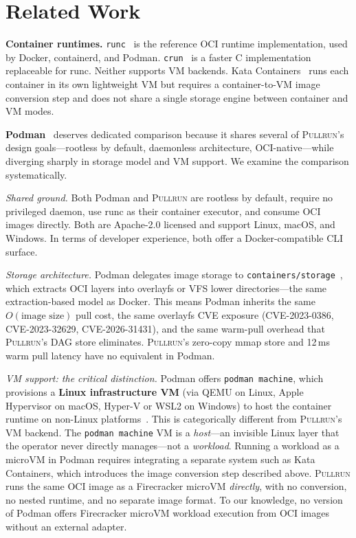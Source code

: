\documentclass[11pt,a4paper]{article}
\newcommand{\pullrun}{\textsc{Pullrun}}
\begin{document}
\section{Related Work}\label{sec:related}

\textbf{Container runtimes.} \texttt{runc}~\cite{runc} is the reference OCI runtime implementation, used by Docker, containerd, and Podman. \texttt{crun}~\cite{crun} is a faster C implementation replaceable for runc. Neither supports VM backends. Kata Containers~\cite{kata} runs each container in its own lightweight VM but requires a container-to-VM image conversion step and does not share a single storage engine between container and VM modes.

\textbf{Podman}~\cite{podman} deserves dedicated comparison because it shares several of \pullrun{}'s design goals---rootless by default, daemonless architecture, OCI-native---while diverging sharply in storage model and VM support. We examine the comparison systematically.

\emph{Shared ground.} Both Podman and \pullrun{} are rootless by default, require no privileged daemon, use runc as their container executor, and consume OCI images directly. Both are Apache-2.0 licensed and support Linux, macOS, and Windows. In terms of developer experience, both offer a Docker-compatible CLI surface.

\emph{Storage architecture.} Podman delegates image storage to \texttt{containers/storage}~\cite{containerstorage}, which extracts OCI layers into overlayfs or VFS lower directories---the same extraction-based model as Docker. This means Podman inherits the same $O(\text{image size})$ pull cost, the same overlayfs CVE exposure (CVE-2023-0386, CVE-2023-32629, CVE-2026-31431), and the same warm-pull overhead that \pullrun{}'s DAG store eliminates. \pullrun{}'s zero-copy mmap store and 12\,ms warm pull latency have no equivalent in Podman.

\emph{VM support: the critical distinction.} Podman offers \texttt{podman machine}, which provisions a \textbf{Linux infrastructure VM} (via QEMU on Linux, Apple Hypervisor on macOS, Hyper-V or WSL2 on Windows) to host the container runtime on non-Linux platforms~\cite{podmandocs}. This is categorically different from \pullrun{}'s VM backend. The \texttt{podman machine} VM is a \emph{host}---an invisible Linux layer that the operator never directly manages---not a \emph{workload}. Running a workload as a microVM in Podman requires integrating a separate system such as Kata Containers, which introduces the image conversion step described above. \pullrun{} runs the same OCI image as a Firecracker microVM \emph{directly}, with no conversion, no nested runtime, and no separate image format. To our knowledge, no version of Podman offers Firecracker microVM workload execution from OCI images without an external adapter.
\end{document}
